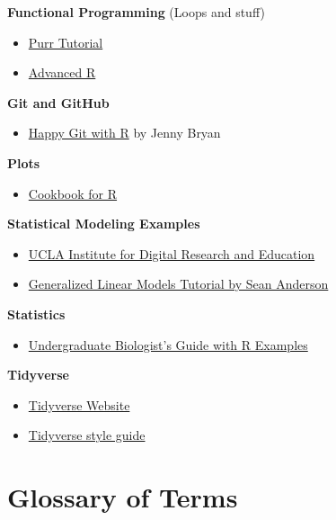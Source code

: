 \documentclass[]{book}
\providecommand{\tightlist}{%
  \setlength{\itemsep}{0pt}\setlength{\parskip}{0pt}}
\begin{document}
\textbf{Functional Programming} (Loops and stuff)

\begin{itemize}
\tightlist
\item
  \href{http://ctlente.com/en/purrr-magic/}{Purr Tutorial}
\item
  \href{\%22http://adv-r.had.co.nz/\%22}{Advanced R}
\end{itemize}

\textbf{Git and GitHub}

\begin{itemize}
\tightlist
\item
  \href{http://happygitwithr.com/}{Happy Git with R} by Jenny Bryan
\end{itemize}

\textbf{Plots}

\begin{itemize}
\tightlist
\item
  \href{http://www.cookbook-r.com/Graphs/}{Cookbook for R}
\end{itemize}

\textbf{Statistical Modeling Examples}

\begin{itemize}
\tightlist
\item
  \href{https://stats.idre.ucla.edu/}{UCLA Institute for Digital
  Research and Education}
\item
  \href{https://github.com/seananderson/glmm-course}{Generalized Linear
  Models Tutorial by Sean Anderson}
\end{itemize}

\textbf{Statistics}

\begin{itemize}
\tightlist
\item
  \href{https://sunsetridgemsbiology.wikispaces.com/file/view/Choosing+and+Using+Statistics.pdf}{Undergraduate
  Biologist's Guide with R Examples}
\end{itemize}

\textbf{Tidyverse}

\begin{itemize}
\tightlist
\item
  \href{http://www.tidyverse.org/}{Tidyverse Website}
\item
  \href{http://style.tidyverse.org/}{Tidyverse style guide}
\end{itemize}

\chapter{Glossary of Terms}\label{glossary-of-terms}
\end{document}
